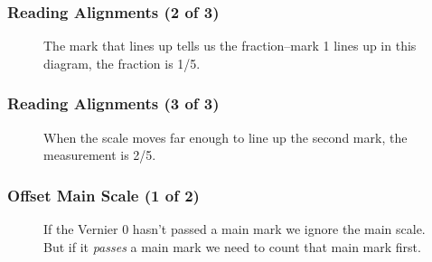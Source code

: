 \begin{frame}
	\frametitle{Reading Alignments (2 of 3)}
    
    \begin{figure}
        \centering
        \resizebox{0.5\columnwidth}{!}{
            
            }
        
        \vspace{0.5em}
        {\footnotesize The mark that lines up tells us the fraction--mark 1 lines up in this diagram, the fraction is 1/5.\par}
    \end{figure}   
\end{frame}

%             

%             

\begin{frame}
	\frametitle{Reading Alignments (3 of 3)}
    
    \begin{figure}
        \centering
        \resizebox{0.5\columnwidth}{!}{
            
            }
        
        \vspace{0.5em}
        {\footnotesize When the scale moves far enough to line up the second mark, the measurement is 2/5.\par}
    \end{figure} 
\end{frame}

\begin{frame}
	\frametitle{Offset Main Scale (1 of 2)}
    
    \begin{figure}
        \centering
        \resizebox{0.75\columnwidth}{!}{
            
            }
        
        \vspace{0.5em}
        {\footnotesize If the Vernier 0 hasn't passed a main mark we ignore the main scale. But if it \emph{passes} a main mark we need to count that main mark first.\par}
    \end{figure} 
\end{frame}

